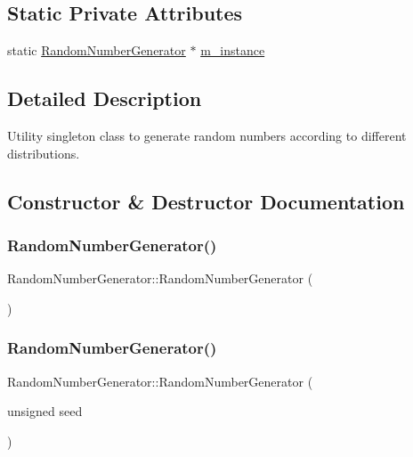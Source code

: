 \subsection*{Static Private Attributes}
\begin{DoxyCompactItemize}
\item 
static \hyperlink{class_random_number_generator}{Random\+Number\+Generator} $\ast$ \hyperlink{class_random_number_generator_a4b1f72cf7dbba86ac83bff4f9f496de3}{m\+\_\+instance}
\end{DoxyCompactItemize}


\subsection{Detailed Description}
Utility singleton class to generate random numbers according to different distributions. 

\subsection{Constructor \& Destructor Documentation}
\mbox{\label{class_random_number_generator_a8e7e711ea58f13f3ed95becbe33684e9}} 
\subsubsection{\texorpdfstring{Random\+Number\+Generator()}{RandomNumberGenerator()}\hspace{0.1cm}{\footnotesize\ttfamily [1/3]}}
{\footnotesize\ttfamily Random\+Number\+Generator\+::\+Random\+Number\+Generator (\begin{DoxyParamCaption}{ }\end{DoxyParamCaption})\hspace{0.3cm}{\ttfamily [private]}}

\mbox{\label{class_random_number_generator_acef4ebf02f3377b707787aa1f69aff1d}} 
\subsubsection{\texorpdfstring{Random\+Number\+Generator()}{RandomNumberGenerator()}\hspace{0.1cm}{\footnotesize\ttfamily [2/3]}}
{\footnotesize\ttfamily Random\+Number\+Generator\+::\+Random\+Number\+Generator (\begin{DoxyParamCaption}\item[{unsigned}]{seed }\end{DoxyParamCaption})\hspace{0.3cm}{\ttfamily [private]}}

